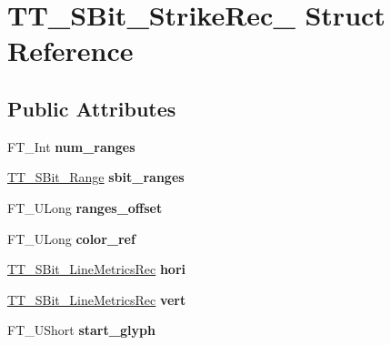\hypertarget{struct_t_t___s_bit___strike_rec__}{
\section{TT\_\-SBit\_\-StrikeRec\_\- Struct Reference}
\label{struct_t_t___s_bit___strike_rec__}
}
\subsection*{Public Attributes}
\begin{DoxyCompactItemize}
\item 
\hypertarget{struct_t_t___s_bit___strike_rec___ae35a351f37cdc865f039056cd233d037}{
FT\_\-Int {\bfseries num\_\-ranges}}
\label{struct_t_t___s_bit___strike_rec___ae35a351f37cdc865f039056cd233d037}

\item 
\hypertarget{struct_t_t___s_bit___strike_rec___a63fb916bdfa41489a180af34b4c092a0}{
\hyperlink{struct_t_t___s_bit___range_rec__}{TT\_\-SBit\_\-Range} {\bfseries sbit\_\-ranges}}
\label{struct_t_t___s_bit___strike_rec___a63fb916bdfa41489a180af34b4c092a0}

\item 
\hypertarget{struct_t_t___s_bit___strike_rec___a740ed4c52dd359f7db5f47c5c4d9f11b}{
FT\_\-ULong {\bfseries ranges\_\-offset}}
\label{struct_t_t___s_bit___strike_rec___a740ed4c52dd359f7db5f47c5c4d9f11b}

\item 
\hypertarget{struct_t_t___s_bit___strike_rec___a5279b83c90ce3c5019575e6a2aaed8e9}{
FT\_\-ULong {\bfseries color\_\-ref}}
\label{struct_t_t___s_bit___strike_rec___a5279b83c90ce3c5019575e6a2aaed8e9}

\item 
\hypertarget{struct_t_t___s_bit___strike_rec___a19b500dbcd1542dcfa92ea7e80f5c21e}{
\hyperlink{struct_t_t___s_bit___line_metrics_rec__}{TT\_\-SBit\_\-LineMetricsRec} {\bfseries hori}}
\label{struct_t_t___s_bit___strike_rec___a19b500dbcd1542dcfa92ea7e80f5c21e}

\item 
\hypertarget{struct_t_t___s_bit___strike_rec___a5366f6968d1126891f2a6f27345abd5c}{
\hyperlink{struct_t_t___s_bit___line_metrics_rec__}{TT\_\-SBit\_\-LineMetricsRec} {\bfseries vert}}
\label{struct_t_t___s_bit___strike_rec___a5366f6968d1126891f2a6f27345abd5c}

\item 
\hypertarget{struct_t_t___s_bit___strike_rec___a05032d4092eef7e7214bb82d4113d8b9}{
FT\_\-UShort {\bfseries start\_\-glyph}}
\label{struct_t_t___s_bit___strike_rec___a05032d4092eef7e7214bb82d4113d8b9}


\end{DoxyCompactItemize}
